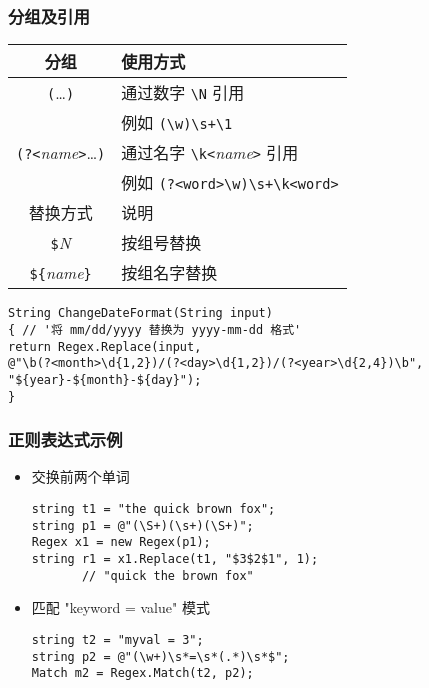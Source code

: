 \begin{frame}[fragile]
\frametitle{分组及引用}
\begin{tabular}{c|l}
\hline
分组                                         & 使用方式                                       \\
\hline
\verb|(|\dots\verb|)|                        & 通过数字 \verb|\N| 引用                       \\
                                             & 例如 \verb|(\w)\s+\1|                         \\
\verb|(?<|\textit{name}\verb|>|\dots\verb|)| & 通过名字 \verb|\k<|\textit{name}\verb|>| 引用 \\
                                             & 例如 \verb|(?<word>\w)\s+\k<word>|             \\
\hline
\hline
替换方式                                     & 说明                                           \\
\hline
\verb|$|\textit{N}                           & 按组号替换                                     \\
\verb|${|\textit{name}\verb|}|               & 按组名字替换                                   \\
\hline
\end{tabular}
\medskip
\begin{lstlisting}[escapeinside='']
String ChangeDateFormat(String input)
{ // '将 mm/dd/yyyy 替换为 yyyy-mm-dd 格式'
return Regex.Replace(input,
@"\b(?<month>\d{1,2})/(?<day>\d{1,2})/(?<year>\d{2,4})\b",
"${year}-${month}-${day}");
}
\end{lstlisting}
\end{frame}

\begin{frame}[fragile]
\frametitle{正则表达式示例}
\begin{itemize}
\item 交换前两个单词
\begin{lstlisting}
string t1 = "the quick brown fox";
string p1 = @"(\S+)(\s+)(\S+)";
Regex x1 = new Regex(p1);
string r1 = x1.Replace(t1, "$3$2$1", 1);
       // "quick the brown fox"
\end{lstlisting}
\item 匹配 "keyword = value" 模式
\begin{lstlisting}
string t2 = "myval = 3";
string p2 = @"(\w+)\s*=\s*(.*)\s*$";
Match m2 = Regex.Match(t2, p2);
\end{lstlisting}
\end{itemize}
\end{frame}

